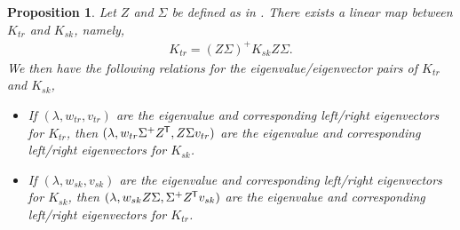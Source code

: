 \documentclass[10pt,a4paper]{amsart}
\newtheorem{proposition}{Proposition}
\newcommand*{\tran}{^{\mkern-1.5mu\mathsf{T}}} %
\begin{document}
\begin{proposition}\label{prop:simp_kedmd}
    Let \(Z\) and \(\Sigma\) be defined as in . There exists a linear map between \(K_{tr}\) and \(K_{sk}\), namely,
    \begin{align*}
        K_{tr} = (Z \Sigma)^+ K_{sk} Z\Sigma.
    \end{align*}
    We then have the following relations for the eigenvalue/eigenvector pairs of \(K_{tr}\) and \(K_{sk}\),
    \begin{itemize}
        \item If \((\lambda, w_{tr}, v_{tr})\) are the eigenvalue and corresponding left/right eigenvectors for \(K_{tr}\), then \((\lambda, w_{tr} \Sigma^+ Z\tran, Z\Sigma v_{tr})\) are the eigenvalue and corresponding left/right eigenvectors for \(K_{sk}\).
        \item If \((\lambda, w_{sk}, v_{sk})\) are the eigenvalue and corresponding left/right eigenvectors for \(K_{sk}\), then \((\lambda, w_{sk} Z\Sigma, \Sigma^+Z\tran v_{sk})\) are the eigenvalue and corresponding left/right eigenvectors for \(K_{tr}\).
    \end{itemize}
\end{proposition}
\end{document}
